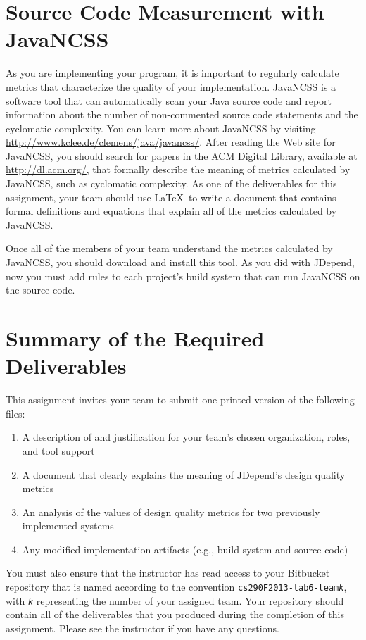 \section*{Source Code Measurement with JavaNCSS}

As you are implementing your program, it is important to regularly calculate metrics that characterize the quality of
your implementation.  JavaNCSS is a software tool that can automatically scan your Java source code and report
information about the number of non-commented source code statements and the cyclomatic complexity.  You can learn more
about JavaNCSS by visiting \url{http://www.kclee.de/clemens/java/javancss/}. After reading the Web site for JavaNCSS,
you should search for papers in the ACM Digital Library, available at \url{http://dl.acm.org/}, that formally describe
the meaning of metrics calculated by JavaNCSS, such as cyclomatic complexity. As one of the deliverables for this assignment, your team should use \LaTeX\ to write a document that contains formal
definitions and equations that explain all of the metrics calculated by JavaNCSS.  

Once all of the members of your team understand the metrics calculated by JavaNCSS, you should download and install
this tool.  As you did with JDepend, now you must add rules to each project's build system that can run JavaNCSS on the
source code. 

\section*{Summary of the Required Deliverables}

This assignment invites your team to submit one printed version of the following files:
\vspace*{-.1in}
\begin{enumerate}
	\itemsep0em 
	\item A description of and justification for your team's chosen organization, roles, and tool support
	\item A document that clearly explains the meaning of JDepend's design quality metrics 
	\item An analysis of the values of design quality metrics for two previously implemented systems 
	\item Any modified implementation artifacts (e.g., build system and source code) 
\end{enumerate}
\vspace*{-.1in}

You must also ensure that the instructor has read access to your Bitbucket repository that is named according to the
convention {\tt cs290F2013-lab6-team{\em k}}, with {\tt {\em k}} representing the number of your assigned team.  Your
repository should contain all of the deliverables that you produced during the completion of this assignment.  Please
see the instructor if you have any questions.


